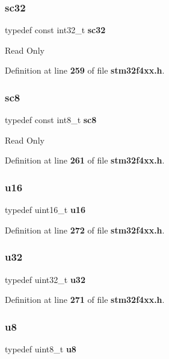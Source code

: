 \subsubsection{sc32}
{\footnotesize\ttfamily typedef const int32\+\_\+t \textbf{ sc32}}

Read Only 

Definition at line \textbf{ 259} of file \textbf{ stm32f4xx.\+h}.

\mbox{\label{group__Exported__types_ga30e6c0f6718e1b6d26dc9d94ddcf9d11}} 
\subsubsection{sc8}
{\footnotesize\ttfamily typedef const int8\+\_\+t \textbf{ sc8}}

Read Only 

Definition at line \textbf{ 261} of file \textbf{ stm32f4xx.\+h}.

\mbox{\label{group__Exported__types_gace9d960e74685e2cd84b36132dbbf8aa}} 
\subsubsection{u16}
{\footnotesize\ttfamily typedef uint16\+\_\+t \textbf{ u16}}



Definition at line \textbf{ 272} of file \textbf{ stm32f4xx.\+h}.

\mbox{\label{group__Exported__types_gafaa62991928fb9fb18ff0db62a040aba}} 
\subsubsection{u32}
{\footnotesize\ttfamily typedef uint32\+\_\+t \textbf{ u32}}



Definition at line \textbf{ 271} of file \textbf{ stm32f4xx.\+h}.

\mbox{\label{group__Exported__types_ga92c50087ca0e64fa93fc59402c55f8ca}} 
\subsubsection{u8}
{\footnotesize\ttfamily typedef uint8\+\_\+t \textbf{ u8}}




